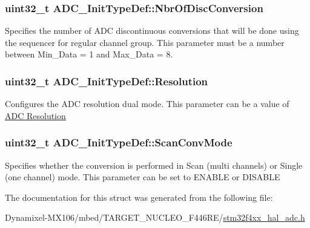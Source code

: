 \subsubsection[{\texorpdfstring{Nbr\+Of\+Disc\+Conversion}{NbrOfDiscConversion}}]{\setlength{\rightskip}{0pt plus 5cm}uint32\+\_\+t A\+D\+C\+\_\+\+Init\+Type\+Def\+::\+Nbr\+Of\+Disc\+Conversion}\hypertarget{struct_a_d_c___init_type_def_a5c0078be814bfe2608ae5758826eafb8}{}\label{struct_a_d_c___init_type_def_a5c0078be814bfe2608ae5758826eafb8}
Specifies the number of A\+DC discontinuous conversions that will be done using the sequencer for regular channel group. This parameter must be a number between Min\+\_\+\+Data = 1 and Max\+\_\+\+Data = 8. 
\subsubsection[{\texorpdfstring{Resolution}{Resolution}}]{\setlength{\rightskip}{0pt plus 5cm}uint32\+\_\+t A\+D\+C\+\_\+\+Init\+Type\+Def\+::\+Resolution}\hypertarget{struct_a_d_c___init_type_def_abebb8d3277cb9a5aae72578076762f5d}{}\label{struct_a_d_c___init_type_def_abebb8d3277cb9a5aae72578076762f5d}
Configures the A\+DC resolution dual mode. This parameter can be a value of \hyperlink{group___a_d_c___resolution}{A\+DC Resolution} 
\subsubsection[{\texorpdfstring{Scan\+Conv\+Mode}{ScanConvMode}}]{\setlength{\rightskip}{0pt plus 5cm}uint32\+\_\+t A\+D\+C\+\_\+\+Init\+Type\+Def\+::\+Scan\+Conv\+Mode}\hypertarget{struct_a_d_c___init_type_def_a47cd689a52562a2481059a5d8ed82788}{}\label{struct_a_d_c___init_type_def_a47cd689a52562a2481059a5d8ed82788}
Specifies whether the conversion is performed in Scan (multi channels) or Single (one channel) mode. This parameter can be set to E\+N\+A\+B\+LE or D\+I\+S\+A\+B\+LE 

The documentation for this struct was generated from the following file\+:\begin{DoxyCompactItemize}
\item 
Dynamixel-\/\+M\+X106/mbed/\+T\+A\+R\+G\+E\+T\+\_\+\+N\+U\+C\+L\+E\+O\+\_\+\+F446\+R\+E/\hyperlink{stm32f4xx__hal__adc_8h}{stm32f4xx\+\_\+hal\+\_\+adc.\+h}\end{DoxyCompactItemize}
